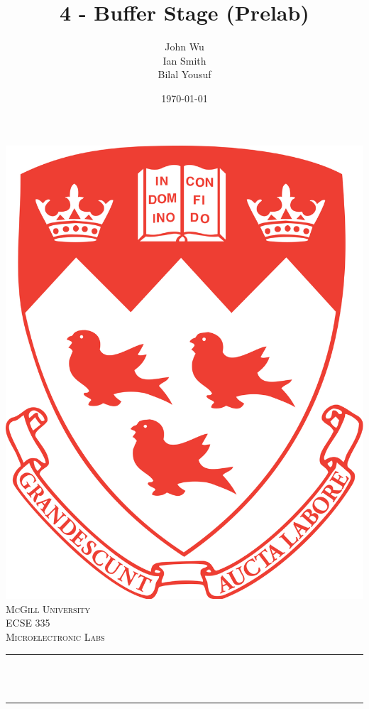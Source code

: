 \documentclass[12pt]{article}
\title{4 - Buffer Stage (Prelab)}                             %
\author{John Wu \\ Ian Smith \\ Bilal Yousuf}                               %
\date{\today}                                                           %
\makeatletter
\let\thetitle\@title
\makeatother
\begin{document}

\begin{titlepage}
    \centering
    \vspace*{0.5 cm}
    \includegraphics[scale = 0.07]{mcgill-logo.png}\\[1.0 cm]   %
    \textsc{\LARGE McGill University}\\[1.0 cm]   %
    \textsc{\Large ECSE 335}\\[0.5 cm]               %
    \textsc{\large Microelectronic Labs}\\[0.5 cm]               %
    \rule{\linewidth}{0.2 mm} \\[0.4 cm]
    { \huge \bfseries \thetitle}\\
    \rule{\linewidth}{0.2 mm} \\[1.5 cm]
    \begin{minipage}{0.4\textwidth}
        \begin{flushleft} \large

\end{flushleft}
\end{minipage}
\end{titlepage}
\end{document}

